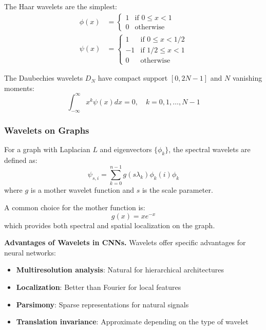 \begin{example}\label{ex:wavelets_haar}
The Haar wavelets are the simplest:
\begin{align}
\phi(x) &= \begin{cases} 1 & \text{if } 0 \leq x < 1 \\ 0 & \text{otherwise} \end{cases} \\
\psi(x) &= \begin{cases} 1 & \text{if } 0 \leq x < 1/2 \\ -1 & \text{if } 1/2 \leq x < 1 \\ 0 & \text{otherwise} \end{cases}
\end{align}
\end{example}

\begin{example}\label{ex:wavelets_daubechies}
The Daubechies wavelets $D_N$ have compact support $[0, 2N-1]$ and $N$ vanishing moments:
\begin{equation}
\int_{-\infty}^{\infty} x^k \psi(x) dx = 0, \quad k = 0, 1, \ldots, N-1
\end{equation}
\end{example}

\subsubsection{Wavelets on Graphs}

\begin{definition}\label{def:wavelets_grafos}
For a graph with Laplacian $L$ and eigenvectors $\{\phi_k\}$, the spectral wavelets are defined as:
\begin{equation}
\psi_{s,i} = \sum_{k=0}^{n-1} g(s\lambda_k) \phi_k(i) \phi_k
\end{equation}
where $g$ is a mother wavelet function and $s$ is the scale parameter.
\end{definition}

\begin{example}[GraphWavelets]\label{ex:graph_wavelets}
A common choice for the mother function is:
\begin{equation}
g(x) = x e^{-x}
\end{equation}
which provides both spectral and spatial localization on the graph.
\end{example}

\textbf{Advantages of Wavelets in CNNs.} Wavelets offer specific advantages for neural networks:
\begin{itemize}
    \item \textbf{Multiresolution analysis}: Natural for hierarchical architectures
    \item \textbf{Localization}: Better than Fourier for local features
    \item \textbf{Parsimony}: Sparse representations for natural signals
    \item \textbf{Translation invariance}: Approximate depending on the type of wavelet
\end{itemize}

